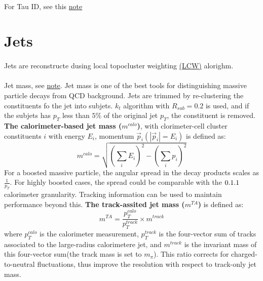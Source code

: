 \paragraph{}
For Tau ID, see this \href{https://cds.cern.ch/record/2248454/files/ATLAS-COM-CONF-2017-015.pdf}{note}

\section{Jets}
\paragraph{}
Jets are reconstructe dusing local topocluster weighting \href{https://arxiv.org/abs/1603.02934}{(LCW)} alorighm. 

\paragraph{}
Jet mass, see \href{https://cds.cern.ch/record/2200211/files/ATLAS-CONF-2016-035.pdf}{note}. Jet mass is one of the best tools for distinguishing massive particle decays from QCD background. Jets are trimmed by re-clustering the constituents fo the jet into subjets. $k_t$ algorithm with $R_{sub} = 0.2$ is used, and if the subjets has $p_T$ less than $5\%$ of the original jet $p_T$, the constituent is removed. \textbf{The calorimeter-based jet mass ($m^{calo}$)}, with clorimeter-cell cluster constituents $i$ with energy $E_i$, momentum $\vec{p}_i (|\vec{p}_i| = E_i)$ is defined as:
\begin{equation}
m^{calo} = \sqrt{(\sum_i E_i)^2 - (\sum_i p_i)^2}
\end{equation}
For a boosted massive particle, the angular spread in the decay products scales as $\frac{1}{p_T}$. For highly boosted cases, the spread could be comparable with the $0.1\time0.1$ calorimeter granularity. Tracking information can be used to maintain performance beyond this. \textbf{The track-assited jet mass ($m^{TA}$)} is defined as:
\begin{equation}
m^{TA} = \frac{p_{T}^{calo}}{p_{T}^{track}} \times m^{track}
\end{equation}
where $p_{T}^{calo}$ is the calorimeter measurement, $p_{T}^{track}$ is the four-vector sum of tracks associated to the large-radius calorimetere jet, and $m^{track}$ is the invariant mass of this four-vector sum(the track mass is set to $m_{\pi}$). This ratio corrects for charged-to-neutral fluctuations, thus improve the resolution with respect to track-only jet mass.

